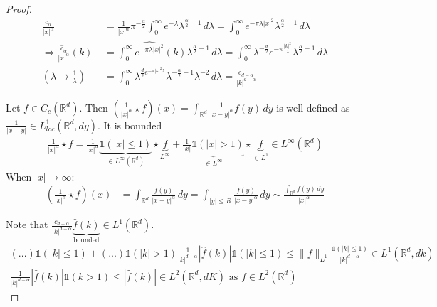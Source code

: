 \documentclass{report}
\theoremstyle{tommy}
\newcommand{\Rd}{\mathbb{R}^d}
\begin{document}
  \begin{proof}
    \begin{align*}
      \frac{c_\alpha}{|x|^\alpha} &= \frac{1}{|x|^\alpha} \pi^{- \frac{\alpha}{2}} \int_0^\infty e^{-\lambda} \lambda^{\frac{\alpha}{2} -1} \, d\lambda = \int_0^\infty e^{- \pi \lambda |x|^2} \lambda^{\frac{\alpha}{2}-1} \, d \lambda \\
      \Rightarrow \frac{\hat c_\alpha}{|x|^\alpha}(k) &= \int_0^\infty \widehat{e^{- \pi \lambda |x|^2}}(k) \lambda^{\frac{\alpha}{2}-1} \, d \lambda = \int_0^\infty \lambda^{-\frac{d}{2}} e^{- \pi \frac{|k|^2}{\lambda}} \lambda^{\frac{\alpha}{2}-1} \, d \lambda \\
      (\lambda \to \frac{1}{\lambda}) \quad &= \int_0^\infty \lambda^{\frac{d}{2} e^{- \pi |k|^2 \lambda}} \lambda^{- \frac{\alpha}{2} + 1} \lambda^{-2} \, d\lambda  = \frac{c_{d-\alpha}}{|k|^{d-\alpha}}
    \end{align*}

    Let \(f \in C_c(\Rd)\). Then \(\left(\frac{1}{|x|^\alpha} \star f\right)(x) = \int_{\Rd} \frac{1}{|x-y|^\alpha} f(y) \, dy\) is well defined as \(\frac{1}{|x-y|} \in L_{loc}^1(\mathbb{R}^d, dy)\). It is bounded
    \begin{align*}
      \frac{1}{|x|^\alpha} \star f = \frac{1}{|x|^\alpha} \underbrace{\mathbb{1}(|x| \le 1)}_{\in L^\infty(\Rd)} \star \underbrace{f}_{L^\infty} + \underbrace{\frac{1}{|x|} \mathbb{1}(|x| > 1)}_{\in L^\infty} \star \underbrace{f}_{\in L^1} \in L^\infty(\Rd)
    \end{align*}
    When \(|x| \to \infty\):
    \begin{align*}
      \left(\frac{1}{|x|^\alpha} \star f\right)(x) &= \int_{\Rd} \frac{f(y)}{|x-y|^\alpha} \, dy = \int_{|y| \le R} \frac{f(y)}{|x-y|^\alpha} \, dy \sim \frac{\int_{\Rd} f(y) \, dy}{|x|^\alpha}
    \end{align*}

    Note that \(\frac{c_{d-\alpha}}{|k|^{d-\alpha}} \underbrace{\hat f(k)}_{\text{bounded}} \in L^1(\Rd)\).
    \begin{align*}
      (...) \mathbb{1}(|k| \le 1) + (...) \mathbb{1}(|k|> 1)
      \frac{1}{|k|^{d - \alpha}}|\hat f(k)| \mathbb{1}(|k| \le 1) \le \|f\|_{L^1} \frac{\mathbb{1}(|k| \le 1)}{|k|^{d-\alpha}} \in L^1(\Rd, dk) \\
      \frac{1}{|k|^{d-\alpha}} |\hat f(k)| \mathbb{1}(k >1) \le |\hat f(k)| \in L^2(\Rd, dK) \text{ as } f \in L^2(\Rd)
    \end{align*}


\end{proof}
\end{document}
